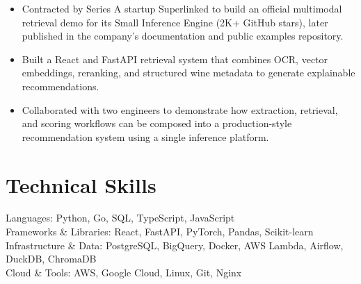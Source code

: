 \documentclass[a4paper,11pt]{article}
\begin{document}
\begin{itemize}[leftmargin=0.35in, itemsep=0.5mm]

\item Contracted by Series A startup Superlinked to build an official multimodal retrieval demo for its Small Inference Engine (2K+ GitHub stars), later published in the company's documentation and public examples repository.

\vspace{-.45mm}

\item Built a React and FastAPI retrieval system that combines OCR, vector embeddings, reranking, and structured wine metadata to generate explainable recommendations.

\vspace{-.45mm}

\item Collaborated with two engineers to demonstrate how extraction, retrieval, and scoring workflows can be composed into a production-style recommendation system using a single inference platform.

\end{itemize}

\vspace{-8mm}

\section{\textbf{Technical Skills}}

\footnotesize

Languages: Python, Go, SQL, TypeScript, JavaScript \\

Frameworks \& Libraries: React, FastAPI, PyTorch, Pandas, Scikit-learn \\

Infrastructure \& Data: PostgreSQL, BigQuery, Docker, AWS Lambda, Airflow, DuckDB, ChromaDB \\

Cloud \& Tools: AWS, Google Cloud, Linux, Git, Nginx
\end{document}
